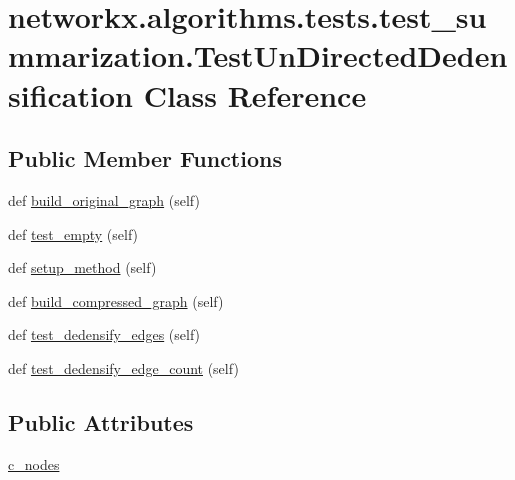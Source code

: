 \hypertarget{classnetworkx_1_1algorithms_1_1tests_1_1test__summarization_1_1TestUnDirectedDedensification}{}\section{networkx.\+algorithms.\+tests.\+test\+\_\+summarization.\+Test\+Un\+Directed\+Dedensification Class Reference}
\label{classnetworkx_1_1algorithms_1_1tests_1_1test__summarization_1_1TestUnDirectedDedensification}
\subsection*{Public Member Functions}
\begin{DoxyCompactItemize}
\item 
def \hyperlink{classnetworkx_1_1algorithms_1_1tests_1_1test__summarization_1_1TestUnDirectedDedensification_a9490a7ea7e8dd1c8a8e5b8138e6cd12b}{build\+\_\+original\+\_\+graph} (self)
\item 
def \hyperlink{classnetworkx_1_1algorithms_1_1tests_1_1test__summarization_1_1TestUnDirectedDedensification_aa028332f9c1afa4d1c8e8cf36599d3e8}{test\+\_\+empty} (self)
\item 
def \hyperlink{classnetworkx_1_1algorithms_1_1tests_1_1test__summarization_1_1TestUnDirectedDedensification_a7572b71e522f986cc2539f9376afdcd0}{setup\+\_\+method} (self)
\item 
def \hyperlink{classnetworkx_1_1algorithms_1_1tests_1_1test__summarization_1_1TestUnDirectedDedensification_a6af760583a92336a7dc229ef33280e28}{build\+\_\+compressed\+\_\+graph} (self)
\item 
def \hyperlink{classnetworkx_1_1algorithms_1_1tests_1_1test__summarization_1_1TestUnDirectedDedensification_a5f3cac489586232a5859c0cb53866187}{test\+\_\+dedensify\+\_\+edges} (self)
\item 
def \hyperlink{classnetworkx_1_1algorithms_1_1tests_1_1test__summarization_1_1TestUnDirectedDedensification_a68739c27310301c7000d189396a656b3}{test\+\_\+dedensify\+\_\+edge\+\_\+count} (self)
\end{DoxyCompactItemize}
\subsection*{Public Attributes}
\begin{DoxyCompactItemize}
\item 
\hyperlink{classnetworkx_1_1algorithms_1_1tests_1_1test__summarization_1_1TestUnDirectedDedensification_a2c4677355f8878661c45b8c6f4a1c3cb}{c\+\_\+nodes}
\end{DoxyCompactItemize}



